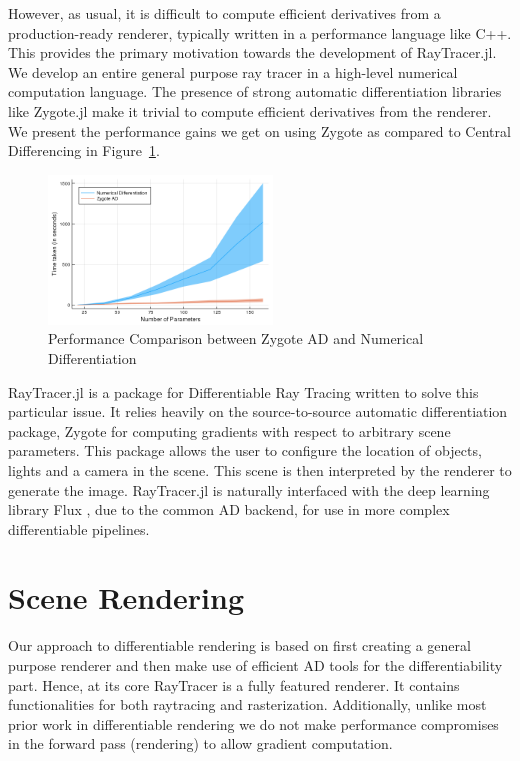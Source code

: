 \documentclass{juliacon}
\begin{document}
However, as usual, it is difficult to compute efficient derivatives from a production-ready renderer, typically written in a performance language like C++. This provides the primary motivation towards the development of RayTracer.jl. We develop an entire general purpose ray tracer in a high-level numerical computation language. The presence of strong automatic differentiation libraries like Zygote.jl make it trivial to compute efficient derivatives from the renderer. We present the performance gains we get on using Zygote as compared to Central Differencing in Figure~\ref{fig:ad_perf}.

\begin{figure}[!htb]
    \centering
    \includegraphics[width=\linewidth, height=150px]{images/differentiation.png}
    \caption{Performance Comparison between Zygote AD and Numerical Differentiation}
    \label{fig:ad_perf}
\end{figure}

RayTracer.jl \cite{RayTracer.jl} is a package for Differentiable Ray Tracing written to solve this particular issue. It relies heavily on the source-to-source automatic differentiation package, Zygote for computing gradients with respect to arbitrary scene parameters. This package allows the user to configure the location of objects, lights and a camera in the scene. This scene is then interpreted by the renderer to generate the image. RayTracer.jl is naturally interfaced with the deep learning library Flux \cite{Flux.jl-2018}, due to the common AD backend, for use in more complex differentiable pipelines.

\section{Scene Rendering}

Our approach to differentiable rendering is based on first creating a general purpose renderer and then make use of efficient AD tools for the differentiability part. Hence, at its core RayTracer is a fully featured renderer. It contains functionalities for both raytracing and rasterization. Additionally, unlike most prior work in differentiable rendering we do not make performance compromises in the forward pass (rendering) to allow gradient computation.
\end{document}
